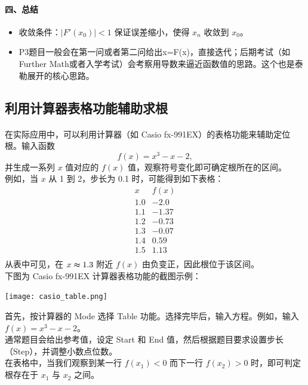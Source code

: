 \documentclass[8pt,a4paper,twoside]{tau-class/tau}
\begin{document}
\begin{tcolorbox}[
enhanced,
breakable,
boxsep=1pt,
colframe=blue!50!black,
colback=white,
fonttitle=\footnotesize,
fontupper=\footnotesize,
title style={align=center},
title=迭代法求根详解（Iteration Method）
]
\paragraph{四、总结}
\begin{itemize}[leftmargin=2em]
  
  \begin{itemize}
    \item 收敛条件：\(\left|F'(x_0)\right|<1\) 保证误差缩小，使得 \(x_n\) 收敛到 \(x_0\)。
    \item P3题目一般会在第一问或者第二问给出x=F(x)，直接迭代；后期考试（如 Further Math或者入学考试）会考察用导数来逼近函数值的思路。这个也是泰勒展开的核心思路。
  \end{itemize}
\end{itemize}

\end{tcolorbox}
\newpage



\subsection{利用计算器表格功能辅助求根}
\paragraph{}
在实际应用中，可以利用计算器（如 Casio fx-991EX）的表格功能来辅助定位根。输入函数
\[
f(x)=x^3 − x − 2,
\]
并生成一系列 \(x\) 值对应的 \(f(x)\) 值，观察符号变化即可确定根所在的区间。\\[4pt]
例如，当 \(x\) 从 1 到 2，步长为 0.1 时，可能得到如下表格：
\[
\begin{array}{c|c}
x & f(x) \\ \hline
1.0 & −2.0 \\
1.1 & −1.37 \\
1.2 & −0.73 \\
1.3 & −0.07 \\
1.4 & 0.59 \\
1.5 & 1.13 \\
\end{array}
\]
从表中可见，在 \(x \thickapprox 1.3\) 附近 \(f(x)\) 由负变正，因此根位于该区间。\\[4pt]
下图为 Casio fx-991EX 计算器表格功能的截图示例：
\begin{center}
\texttt{[image: casio\_table.png]}
\end{center}
\begin{tcolorbox}[enhanced, breakable, boxsep=1pt, colframe=blue!50!black, colback=white, fonttitle=\footnotesize, fontupper=\footnotesize, title style={align=center}, title=计算器表格功能使用说明]
首先，按计算器的 Mode 选择 Table 功能。选择完毕后，输入方程。例如，输入 \(f(x)=x^3−x−2\)。
\\[4pt]
通常题目会给出参考值，设定 Start 和 End 值，然后根据题目要求设置步长（Step），并调整小数点位数。\\[4pt]
在表格中，当我们观察到某一行 \(f(x_1) < 0\) 而下一行 \(f(x_2) > 0\) 时，即可判定根存在于 \(x_1\) 与 \(x_2\) 之间。
\end{tcolorbox}
\newpage
\end{document}
